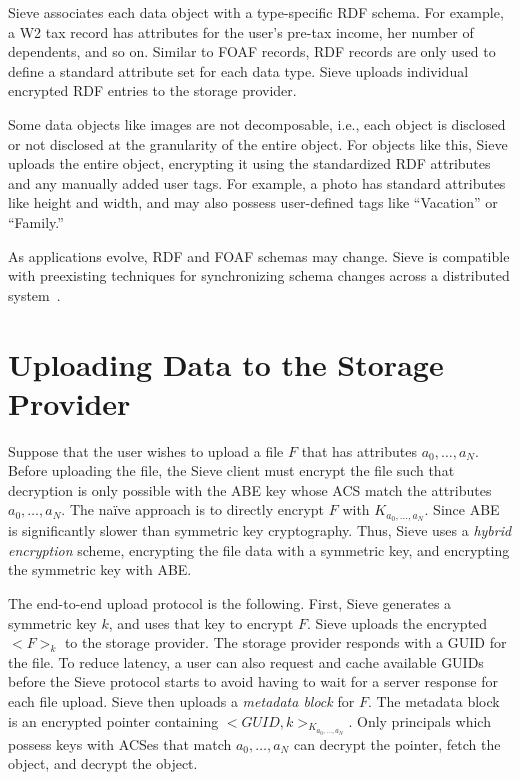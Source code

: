 Sieve associates each data object with a
type-specific RDF schema. For example, a
W2 tax record has attributes for the user's
pre-tax income, her number of dependents,
and so on. Similar to FOAF records, RDF
records are only used to define a standard
attribute set for each data type. Sieve uploads 
individual encrypted RDF entries
to the storage provider.

Some data objects like images are not
decomposable, i.e., each object is disclosed
or not disclosed at the granularity of the
entire object. For objects like this, Sieve
uploads the entire object, encrypting it
using the standardized RDF attributes and
any manually added user tags. For example,
a photo has standard attributes like height
and width, and may also possess user-defined
tags like ``Vacation'' or ``Family.''

As applications evolve, RDF and FOAF schemas
may change. Sieve is compatible with
preexisting techniques for synchronizing
schema changes across a distributed system~\cite{f1,maintaindataware, onthefly}.

\section{Uploading Data to the Storage Provider}
\label{sec:dataPush}

Suppose that the user wishes to upload a file
$F$ that has attributes $a_0,\ldots,a_N$.
Before uploading the file, the Sieve client
must encrypt the file such that decryption
is only possible with the ABE key whose ACS
match the attributes $a_0,\ldots,a_N$. The na{\"i}ve
approach is to directly encrypt $F$ with
$K_{a_0,\ldots,a_N}$. Since ABE is significantly
slower than symmetric key cryptography. Thus,
Sieve uses a \textit{hybrid encryption} scheme,
encrypting the file data with a symmetric key,
and encrypting the symmetric key with ABE.

The end-to-end upload protocol is the following.
First, Sieve generates a symmetric key $k$,
and uses that key to encrypt $F$. Sieve uploads
the encrypted $<F>_k$ to the storage provider.
The storage provider responds with a GUID for
the file. To reduce latency, a user can also
request and cache available GUIDs before
the Sieve protocol starts to avoid having to
wait for a server response for each file upload. 
Sieve then uploads a \emph{metadata
block} for $F$. The metadata block is an encrypted
pointer containing $<GUID, k>_{K_{a_0,\ldots,a_N}}$.
Only principals which possess keys with ACSes that
match $a_0,\ldots,a_N$ can
decrypt the pointer, fetch the object, and
decrypt the object.


